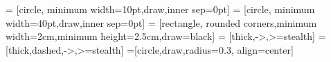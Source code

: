 \renewcommand\thesubfigure{(\alph{subfigure})}
\newcommand{\tDelta}{\textsf{Delta}\xspace}

\usetikzlibrary{decorations.pathmorphing}
 = [circle, minimum width=10pt,draw,inner sep=0pt]
 = [circle, minimum width=40pt,draw,inner sep=0pt]
 = [rectangle, rounded corners,minimum width=2cm,minimum height=2.5cm,draw=black]
 = [thick,->,>=stealth]
 = [thick,dashed,->,>=stealth]
=[circle,draw,radius=0.3, align=center]

